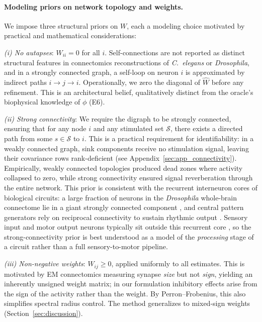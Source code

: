 \documentclass{article}
\begin{document}
\paragraph{Modeling priors on network topology and weights.}
We impose three structural priors on $W$, each a modeling choice motivated by practical and mathematical considerations:

\emph{(i) No autapses}: $W_{ii} = 0$ for all $i$. Self-connections are not reported as distinct structural features in connectomics reconstructions of \textit{C.~elegans} \citep{white1986structure, cook2019whole} or \textit{Drosophila}, and in a strongly connected graph, a self-loop on neuron $i$ is approximated by indirect paths $i \to j \to i$. Operationally, we zero the diagonal of $\hat{W}$ before any refinement. This is an architectural belief, qualitatively distinct from the oracle's biophysical knowledge of $\phi$ (E6).

\emph{(ii) Strong connectivity}: We require the digraph to be strongly connected, ensuring that for any node $i$ and any stimulated set $\mathcal{S}$, there exists a directed path from some $s \in \mathcal{S}$ to $i$.
This is a practical requirement for identifiability: in a weakly connected graph, sink components receive no stimulation signal, leaving their covariance rows rank-deficient (see Appendix~\ref{sec:app_connectivity}).
Empirically, weakly connected topologies produced dead zones where activity collapsed to zero, while strong connectivity ensured signal reverberation through the entire network.
This prior is consistent with the recurrent interneuron cores of biological circuits: a large fraction of neurons in the \textit{Drosophila} whole-brain connectome lie in a giant strongly connected component \citep{lin2024network}, and central pattern generators rely on reciprocal connectivity to sustain rhythmic output \citep{marder2007understanding}.
Sensory input and motor output neurons typically sit outside this recurrent core \citep{varshney2011structural}, so the strong-connectivity prior is best understood as a model of the \emph{processing} stage of a circuit rather than a full sensory-to-motor pipeline.

\emph{(iii) Non-negative weights}: $W_{ij} \geq 0$, applied uniformly to all estimates. This is motivated by EM connectomics measuring synapse \emph{size} but not \emph{sign}, yielding an inherently unsigned weight matrix; in our formulation inhibitory effects arise from the sign of the activity rather than the weight. By Perron--Frobenius, this also simplifies spectral radius control. The method generalizes to mixed-sign weights (Section~\ref{sec:discussion}).
\end{document}

